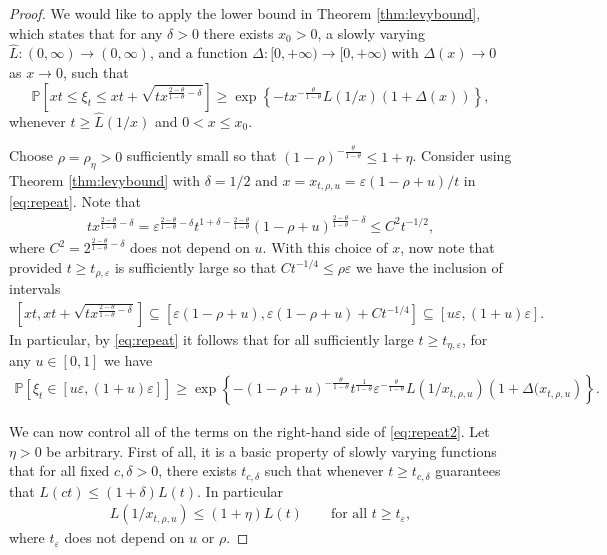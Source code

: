 \documentclass[a4,12pt]{amsart}
\numberwithin{equation}{section}
\begin{document}
	\begin{proof}
We would like to apply the lower bound in Theorem \ref{thm:levybound}, which states that for any $\delta>0$ there exists $x_0 > 0$, a slowly varying $\hat{L}:(0,\infty) \to (0,\infty)$, and  a function $\Delta \colon [0,+\infty) \to [0,+\infty)$ with $\Delta(x) \to 0$ as $x \to 0$, such that 
\begin{equation} \label{eq:repeat}
	\mathbb{P}\left[ xt \leq \xi_t \leq xt +\sqrt{t x^{ \frac{2-\theta}{1-\theta} - \delta}} \right] 
	\geq \exp \left\{ -  t x^{ - \frac{\theta}{1-\theta}} L(1/x) (1 + \Delta(x)) \right\},
\end{equation}
whenever $t \geq \hat{L}(1/x)$ and $0 < x \leq x_0$.

Choose $\rho = \rho_\eta > 0$ sufficiently small so that $(1 - \rho)^{ - \frac{\theta}{1-\theta}} \leq 1 + \eta$. 
Consider using Theorem \ref{thm:levybound} with $\delta=1/2$ and $x = x_{t,\rho,u} = \varepsilon(1-\rho+u)/t$ in \eqref{eq:repeat}. Note that
\begin{align*}
tx^{\frac{2-\theta}{1-\theta}-\delta} = \varepsilon^{\frac{2-\theta}{1-\theta} - \delta} t^{ 1 + \delta - \frac{2-\theta}{1-\theta}}(1-\rho+ u )^{\frac{2-\theta}{1-\theta} - \delta} \leq C^2 t^{-1/2},
\end{align*}
where $C^2 = 2^{\frac{2-\theta}{1-\theta} - \delta} $ does not depend on $u$. With this choice of $x$, now note that provided $t \geq t_{\rho,\varepsilon}$ is sufficiently large so that $Ct^{-1/4} \leq \rho \varepsilon$ we have the inclusion of intervals
\begin{align*}
\left[  xt , xt +\sqrt{t x^{ \frac{2-\theta}{1-\theta} - \delta}} \right] \subseteq \left[ \varepsilon(1-\rho+u) ,\varepsilon(1-\rho+u)  + C t^{-1/4} \right] \subseteq [ u\varepsilon, (1+u)\varepsilon].
\end{align*}
In particular, by \eqref{eq:repeat} it follows that for all sufficiently large $t \geq t_{\eta, \varepsilon}$, for any $u \in [0,1]$ we have 
\begin{align}  \label{eq:repeat2}
\mathbb{P}\left[ \xi_t \in [u\varepsilon,(1+u)\varepsilon] \right] \geq  \exp \left\{ - (1-\rho+u)^{- \frac{\theta}{1-\theta}} t^{\frac{1}{1-\theta}} \varepsilon^{ - \frac{\theta}{1-\theta}}  L ( 1/x_{t,\rho,u}) \left(1 + \Delta ( x_{t,\rho,u} \right)   \right\}.
\end{align}

We can now control all of the terms on the right-hand side of \eqref{eq:repeat2}. Let $\eta > 0$ be arbitrary. First of all, it is a basic property of slowly varying functions that for all fixed $c, \delta > 0$, there exists $t_{c,\delta}$ such that whenever $t \geq t_{c,\delta}$ guarantees that $L(ct) \leq (1+\delta) L(t)$. In particular 
\begin{align} \label{eq:y1}
L(1/x_{t,\rho,u}) \leq (1+\eta) L(t) \qquad \text{for all $t \geq t_\varepsilon$},
\end{align}
where $t_\varepsilon$ does not depend on $u$ or $\rho$. 


\end{proof}
\end{document}
